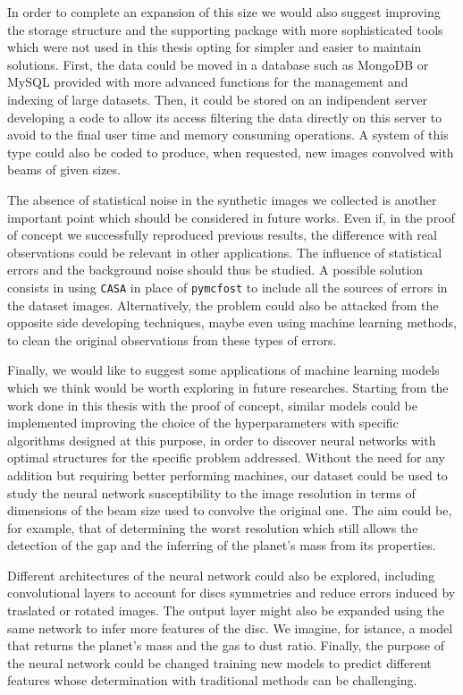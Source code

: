 \documentclass[a4paper,10pt]{report}
\begin{document}
In order to complete an expansion of this size we would also suggest improving the storage structure
and the supporting package with more sophisticated tools which were not used in this thesis opting for
simpler and easier to maintain solutions. First, the data could be moved in a database such as MongoDB or MySQL
provided with more advanced functions for the management and indexing of large datasets.
Then, it could be stored on an indipendent server developing a code to allow its access filtering the data directly on 
this server to avoid to the final user time and memory consuming operations. A system of this type could also be coded to
produce, when requested, new images convolved with beams of given sizes.

The absence of statistical noise in the synthetic images we collected is another important point
which should be considered in future works. Even if, 
in the proof of concept we successfully reproduced previous results, the difference with real observations 
could be relevant in other applications.
The influence of statistical errors and the background noise should thus be studied.
A possible solution consists in using \lstinline{CASA} in place of \lstinline{pymcfost} to 
include all the sources of errors in the dataset images. Alternatively,
the problem could also be attacked from the opposite side developing techniques,
maybe even using machine learning methods, to clean the original observations from these types of errors.

Finally, we would like to suggest some applications of machine learning
models which we think would be worth exploring in future researches.
Starting from the work done in this thesis with the proof of concept, similar 
models could be implemented improving the choice of the hyperparameters with 
specific algorithms designed at this purpose, in order to discover neural networks
with optimal structures for the specific problem addressed.
Without the need for any addition but requiring better performing machines, our 
dataset could be used to study the neural network susceptibility to the image resolution in terms of dimensions of
the beam size used to convolve the original one. The aim could be, for example, that of determining the worst resolution which
still allows the detection of the gap and the inferring of the planet's mass from its properties.

Different architectures of the neural network could also be explored, including convolutional
layers to account for discs symmetries and reduce errors induced by traslated or rotated images.
The output layer might also be expanded using the same network to infer more features of the disc. We imagine, 
for istance, a model that returns the planet's mass and the gas to dust ratio. Finally, the purpose of the neural network
could be changed training new models to predict different features whose determination
with traditional methods can be challenging.
\end{document}
